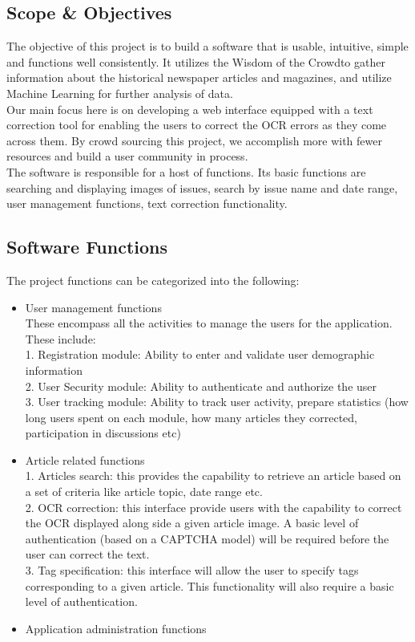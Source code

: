 \documentclass[amsart, 12pt]{article}
\begin{document}
\subsection{Scope \& Objectives}
The objective of this project is to build a software that is usable, intuitive, simple and functions well consistently. It utilizes the \textasciigrave Wisdom of the Crowd\textasciiacute to gather information about the historical newspaper articles and magazines, and utilize Machine Learning for further analysis of data.\\
Our main focus here is on developing a web interface equipped with a text correction tool for enabling the users to correct the OCR errors as they come across them. By crowd sourcing this project, we accomplish more with fewer resources and build a user community in process.\\
The software is responsible for a host of functions. Its basic functions are searching and displaying images of issues, search by issue name and date range, user management functions, text correction functionality.\\
\subsection{Software Functions}
The project functions can be categorized into the following:
\begin{itemize}
\item User management functions \\
These encompass all the activities to manage the users for the application.  These include: \\
1.	Registration module: Ability to enter and validate user demographic information \\
2.	User Security module: Ability to authenticate and authorize the user \\
3.	User tracking module: Ability to track user activity, prepare statistics (how long users spent on each module, how many articles they corrected, participation in discussions etc) \\

\item Article related functions \\
1.	Articles search: this provides the capability to retrieve an article based on a set of criteria like article topic, date range etc. \\
2.	OCR correction: this interface provide users with the capability to correct the OCR displayed along side a given article image.  A basic level of authentication (based on a CAPTCHA model) will be required before the user can correct the text. \\
3.	Tag specification: this interface will allow the user to specify tags corresponding to a given article.  This functionality will also require a basic level of authentication. \\

\item Application administration functions
\end{itemize}
\end{document}
